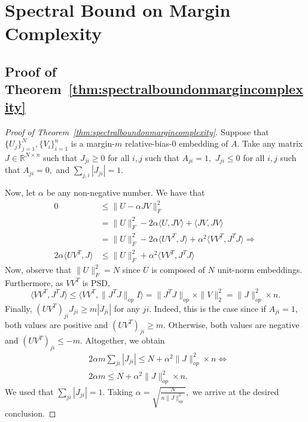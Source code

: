 \documentclass[preprint]{article}
\begin{document}
\section{Spectral Bound on Margin Complexity}
\label{sec:spectral}
\subsection{Proof of Theorem~\texorpdfstring{\ref{thm:spectralboundonmargincomplexity}}{Spectral Bound}}
\begin{proof}[Proof of Theorem~\ref{thm:spectralboundonmargincomplexity}]
Suppose that $\{U_j\}_{j = 1}^N, \{V_i\}_{i = 1}^n$ is a margin-$m$ relative-bias-$0$ embedding of $A.$ Take any matrix $J\in \mathbb{R}^{N\times n}$ such that $J_{ji} \ge 0$ for all $i,j$ such that $A_{ji} = 1,$  
$J_{ji} \le 0$ for all $i,j$ such that $A_{ji} = 0,$ and 
$\sum_{j,i}|J_{ji}| = 1.$

Now, let $\alpha$ be any non-negative number. We have that 
    \begin{equation}
        \begin{split}
            0 & \le  \|U - \alpha JV\|_F^2 \\
              &  = \|U\|_F^2 - 2\alpha \langle U, JV\rangle + \langle JV, JV\rangle\\
              & = \|U\|_F^2 - 2\alpha \langle UV^T, J\rangle + \alpha^2\langle VV^T, J^TJ\rangle
              \Longrightarrow\\
            2\alpha \langle UV^T, J\rangle & \le  \|U\|_F^2 + \alpha^2\langle VV^T, J^TJ\rangle
        \end{split}
    \end{equation}
    Now, observe that
    $\|U\|_F^2  = N$ since $U$ is composed of $N$ unit-norm embeddings.
    Furthermore, as $VV^T$ is PSD,
    $$
    \langle VV^T, J^TJ\rangle \le \langle VV^T, \|J^TJ\|_{op} I\rangle = 
    \|J^TJ\|_{op} \times \|V\|_2^2 = \|J\|_{op}^2 \times n.
    $$
    Finally,
    $(UV^T)_{ji}J_{ji}\ge m |J_{ji}|$ for any $ji.$ Indeed, this is the case since if $A_{ji} = 1,$ both values are positive and $(UV^T)_{ji} \ge m.$ Otherwise, both values are negative and $(UV^T)_{ji} \le - m.$
    Altogether, we obtain 
    \begin{equation}
        \begin{split}
            & 2\alpha m \sum_{ji}|J_{ji}| \le  N  + \alpha^2 \|J\|_{op}^2 \times n \Longleftrightarrow\\
            & 2\alpha m \le N +  \alpha^2 \|J\|_{op}^2 \times n.
        \end{split}
    \end{equation}
    We used that $\sum_{ji}|J_{ji}|  = 1.$
Taking $\alpha = \sqrt{\frac{N}{n \|J\|^2_{op}}},$ we arrive at the desired conclusion.
\end{proof}
\end{document}
